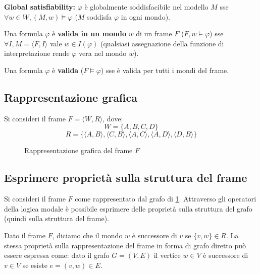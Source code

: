 \textbf{Global satisfiability:} $\varphi$ è globalmente soddisfacibile nel modello $M$ sse $\forall w \in W, (M, w) \models \varphi$ ($M$ soddisfa $\varphi$ in ogni mondo).

Una formula $\varphi$ è \textbf{valida in un mondo} $w$ di un frame $F$ ($F, w \models \varphi$) sse $\forall I, M = \langle F, I \rangle$ vale $w \in I(\varphi)$ (qualsiasi assegnazione della funzione di interpretazione rende $\varphi$ vera nel mondo $w$).

Una formula $\varphi$ è \textbf{valida} ($F \models \varphi$) sse è valida per tutti i mondi del frame.

\subsection{Rappresentazione grafica}

Si consideri il frame $F = \langle W, R \rangle$, dove:
$$W = \lbrace A, B, C, D \rbrace$$
$$R = \lbrace \langle A, B \rangle, \langle C, B \rangle, \langle A, C \rangle, \langle A, D \rangle, \langle D, B \rangle \rbrace$$

\begin{center}
\begin{figure}[H]
\centering
{}
\caption{Rappresentazione grafica del frame $F$}
\label{fig:kripke-graph}
\end{figure}
\end{center}

\subsection{Esprimere proprietà sulla struttura del frame}

Si consideri il frame $F$ come rappresentato dal grafo di \ref{fig:kripke-graph}. Attraverso gli operatori della logica modale è possibile esprimere delle proprietà sulla struttura del grafo (quindi sulla struttura del frame).

Dato il frame $F$, diciamo che il mondo $w$ è successore di $v$ se $\lbrace v, w \rbrace \in R$. La stessa proprietà sulla rappresentazione del frame in forma di grafo diretto può essere espressa come: dato il grafo $G = (V, E)$ il vertice $w \in V$ è successore di $v \in V$ se esiste $e = (v, w) \in E$.

